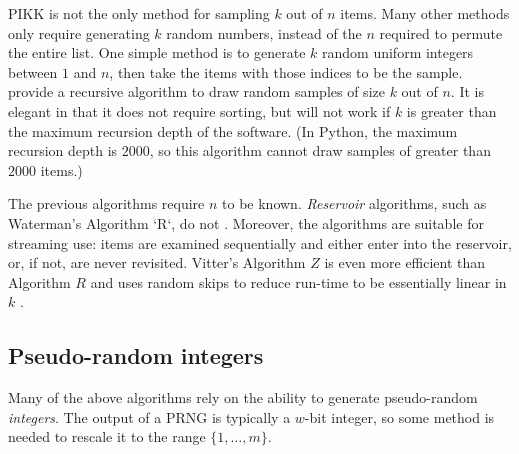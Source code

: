 \documentclass[graybox]{svmult}
\newcommand*\Let[2]{\State #1 $\gets$ #2}
\begin{document}
      
PIKK is not the only method for sampling $k$ out of $n$ items.
Many other methods only require generating $k$ random numbers, instead of the $n$ required to permute the entire list.
One simple method is to generate $k$ random uniform integers between $1$ and $n$, then take the items with those indices to be the sample.
\cite{cormen_introduction_2009} provide a recursive algorithm to draw random samples of size $k$ out of $n$.
It is elegant in that it does not require sorting, but will not work if $k$ is greater than the maximum recursion depth of the software.
(In Python, the maximum recursion depth is $2000$, so this algorithm cannot draw samples of greater than $2000$ items.)
%
%
%
%
%

The previous algorithms require $n$ to be known.
\emph{Reservoir} algorithms, such as Waterman's Algorithm `R`, do not  \cite{knuth_art_1997}.
Moreover, the algorithms are suitable for streaming use: items are examined
sequentially and either enter into the reservoir, or, if not, are never revisited.
Vitter's Algorithm $Z$ is even more efficient than Algorithm $R$ and uses random skips to reduce run-time to be essentially linear in $k$ \cite{vitter_random_1985}.


\subsection{Pseudo-random integers}
\label{sec:integers}
Many of the above algorithms rely on the ability to generate pseudo-random \emph{integers}.
The output of a PRNG is typically a $w$-bit integer, so some method is needed to rescale it to the range $\{1, \ldots, m\}$.
\end{document}

